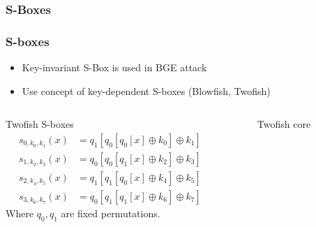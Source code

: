 \documentclass{beamer}
\begin{document}
\subsubsection{S-Boxes}
\begin{frame}
    \frametitle{S-boxes}
    \begin{itemize}
     \item Key-invariant S-Box is used in BGE attack
     \item Use concept of key-dependent S-boxes (Blowfish, Twofish)
    \end{itemize}
    
     \begin{columns}
     \begin{column}{0.50\textwidth}
	Twofish S-boxes
 	\begin{subequations}
	\begin{align}
	    s_{0,k_0,k_1}\left(x\right) &= q_1\left[q_0\left[q_0\left[x\right] \oplus k_0 \right] \oplus k_1 \right] \nonumber \\
	    s_{1,k_2,k_3}\left(x\right) &= q_0\left[q_0\left[q_1\left[x\right] \oplus k_2 \right] \oplus k_3 \right] \nonumber \\
	    s_{2,k_4,k_5}\left(x\right) &= q_1\left[q_1\left[q_0\left[x\right] \oplus k_4 \right] \oplus k_5 \right] \nonumber \\
	    s_{3,k_6,k_7}\left(x\right) &= q_0\left[q_1\left[q_1\left[x\right] \oplus k_6 \right] \oplus k_7 \right] \nonumber
	\end{align}
	\end{subequations}
	Where $q_0, q_1$ are fixed permutations.
     \end{column}
 
     \begin{column}{0.50\textwidth}
 	\begin{figure}
	\begin{center}
	\leavevmode
	\centerline{}
	\end{center}
	\caption{Twofish core}
	\end{figure} 
     \end{column}
     \end{columns}
\end{frame}
\end{document}
